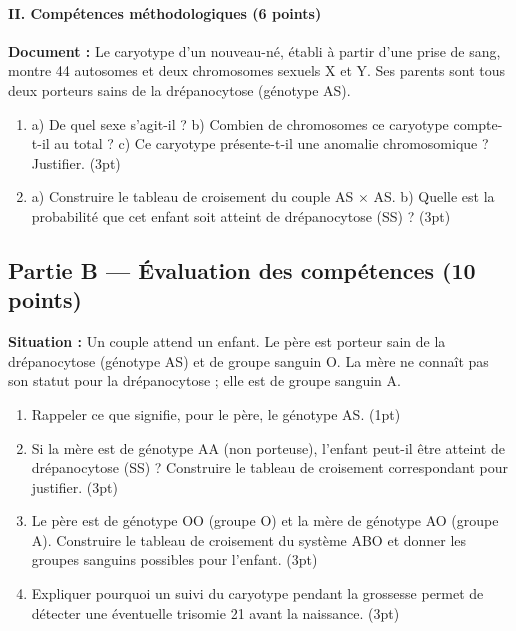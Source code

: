 \paragraph{II. Compétences méthodologiques (6 points)}
\noindent\textbf{Document :} Le caryotype d'un nouveau-né, établi à partir d'une
prise de sang, montre 44 autosomes et deux chromosomes sexuels X et Y. Ses parents
sont tous deux porteurs sains de la drépanocytose (génotype AS).
\begin{enumerate}[label=\arabic*)]
\item a) De quel sexe s'agit-il ? b) Combien de chromosomes ce caryotype compte-t-il
au total ? c) Ce caryotype présente-t-il une anomalie chromosomique ? Justifier.
\hfill (3pt)
\item a) Construire le tableau de croisement du couple AS $\times$ AS. b) Quelle est
la probabilité que cet enfant soit atteint de drépanocytose (SS) ? \hfill (3pt)
\end{enumerate}

\subsection*{Partie B — Évaluation des compétences (10 points)}

\noindent\textbf{Situation :} Un couple attend un enfant. Le père est porteur sain de
la drépanocytose (génotype AS) et de groupe sanguin O. La mère ne connaît pas son
statut pour la drépanocytose ; elle est de groupe sanguin A.

\begin{enumerate}[label=\textbf{Tâche \arabic*.}, leftmargin=2.2cm]
\item Rappeler ce que signifie, pour le père, le génotype AS. \hfill (1pt)
\item Si la mère est de génotype AA (non porteuse), l'enfant peut-il être atteint de
drépanocytose (SS) ? Construire le tableau de croisement correspondant pour
justifier. \hfill (3pt)
\item Le père est de génotype OO (groupe O) et la mère de génotype AO (groupe A).
Construire le tableau de croisement du système ABO et donner les groupes sanguins
possibles pour l'enfant. \hfill (3pt)
\item Expliquer pourquoi un suivi du caryotype pendant la grossesse permet de
détecter une éventuelle trisomie 21 avant la naissance. \hfill (3pt)
\end{enumerate}

